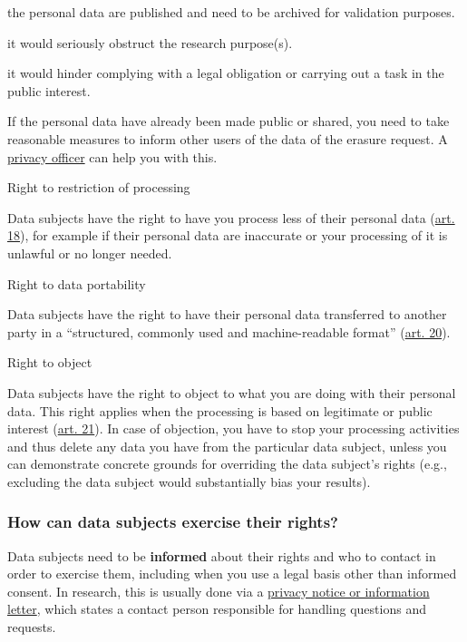 \documentclass[
]{book}
\begin{document}
the personal data are published and need to be archived for validation
purposes.

it would seriously obstruct the research purpose(s).

it would hinder complying with a legal obligation or carrying out a task
in the public interest.

If the personal data have already been made public or shared, you need to
take reasonable measures to inform other users of the data of the erasure
request. A \protect\hyperlink{support}{privacy officer} can help you with this.

Right to restriction of processing

Data subjects have the right to have you process less of their personal data
(\href{https://gdpr-info.eu/art-18-gdpr/}{art. 18}),
for example if their personal data are inaccurate or your processing of it
is unlawful or no longer needed.

Right to data portability

Data subjects have the right to have their personal data transferred to
another party in a ``structured, commonly used and machine-readable format''
(\href{https://gdpr-info.eu/art-20-gdpr/}{art. 20}).

Right to object

Data subjects have the right to object to what you are doing with their
personal data. This right applies when the processing is based on legitimate
or public interest (\href{https://gdpr-info.eu/art-21-gdpr/}{art. 21}).
In case of objection, you have to stop your processing activities and thus
delete any data you have from the particular data subject, unless you can
demonstrate concrete grounds for overriding the data subject's rights
(e.g., excluding the data subject would substantially bias your results).

\hypertarget{how-can-data-subjects-exercise-their-rights}{%
\subsubsection{How can data subjects exercise their rights?}\label{how-can-data-subjects-exercise-their-rights}}

Data subjects need to be \textbf{informed} about their rights and who to contact in
order to exercise them, including when you use a legal basis other than informed
consent. In research, this is usually done via a
\protect\hyperlink{privacy-notices}{privacy notice or information letter}, which states
a contact person responsible for handling questions and requests.
\end{document}
